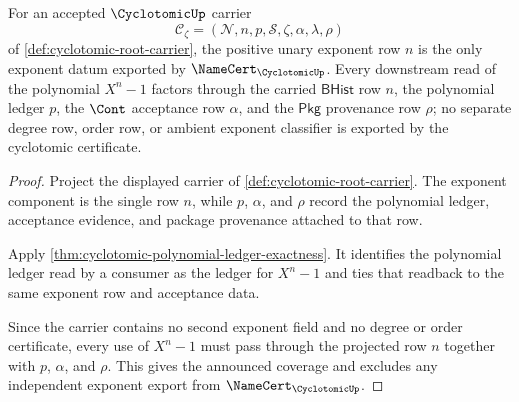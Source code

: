 \begin{theorem}
\label{thm:cyclotomic-positive-exponent-row-coverage}
For an accepted $\CyclotomicUp$ carrier
$$
\mathcal{C}_{\zeta}=(\mathcal{N},n,p,\mathcal{S},\zeta,\alpha,\lambda,\rho)
$$
of \autoref{def:cyclotomic-root-carrier}, the positive unary exponent row $n$ is the only exponent datum exported by $\NameCert_{\CyclotomicUp}$. Every downstream read of the polynomial $X^n-1$ factors through the carried $\mathsf{BHist}$ row $n$, the polynomial ledger $p$, the $\Cont$ acceptance row $\alpha$, and the $\mathsf{Pkg}$ provenance row $\rho$; no separate degree row, order row, or ambient exponent classifier is exported by the cyclotomic certificate.
\end{theorem}
\begin{proof}
Project the displayed carrier of \autoref{def:cyclotomic-root-carrier}. The exponent component is the single row $n$, while $p$, $\alpha$, and $\rho$ record the polynomial ledger, acceptance evidence, and package provenance attached to that row.

Apply \autoref{thm:cyclotomic-polynomial-ledger-exactness}. It identifies the polynomial ledger read by a consumer as the ledger for $X^n-1$ and ties that readback to the same exponent row and acceptance data.

Since the carrier contains no second exponent field and no degree or order certificate, every use of $X^n-1$ must pass through the projected row $n$ together with $p$, $\alpha$, and $\rho$. This gives the announced coverage and excludes any independent exponent export from $\NameCert_{\CyclotomicUp}$.
\end{proof}

